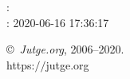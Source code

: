 \documentclass[11pt]{article}
\begin{document}
    \newcommand{\SampleTwoCol}{\SampleTwoColInputOutput{sample-000}{}}
    \newcommand{\SampleOneCol}{\SampleOneColInputOutput{sample-000}{}}

    \ProblemInformation
    \Author: \\    
    \Generation: 2020-06-16 17:36:17

    \bigskip

    \copyright\ \emph{Jutge.org}, 2006--2020. \\
    https:$/\!\!/$jutge.org
\end{document}
